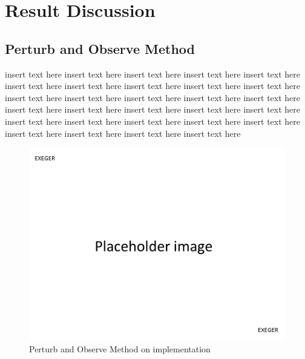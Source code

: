 \chapter{Result Discussion}
 \section{Perturb and Observe Method }
 insert text here insert text here insert text here insert text here insert text here
 insert text here insert text here insert text here insert text here insert text here insert text here insert text here insert text here insert text here insert text here insert text here insert text here insert text here insert text here insert text here insert text here insert text here insert text here insert text here insert text here insert text here insert text here insert text here insert text here   \\
  \begin{figure}[H]
   \begin{center}
   \includegraphics[width=\textwidth]{images/pacehold}
   \caption{Perturb and Observe Method on implementation   }
   \label{fig:PnO_result}
   \end{center}
   \end{figure}
